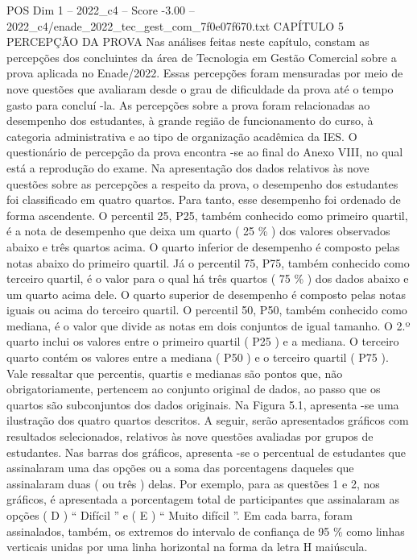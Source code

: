 \begin{textsample}{POS Dim 1 – 2022\_c4 – Score -3.00 – 2022\_c4/enade\_2022\_tec\_gest\_com\_7f0e07f670.txt}  \label{ex:f1_pos_257}
CAPÍTULO 5 PERCEPÇÃO DA PROVA Nas análises feitas neste capítulo, constam as percepções dos concluintes da área de Tecnologia em Gestão Comercial sobre a prova aplicada no Enade/2022.
Essas percepções foram mensuradas por meio de nove questões que avaliaram desde o grau de dificuldade da prova até o tempo gasto para concluí -la.
As percepções sobre a prova foram relacionadas ao desempenho dos estudantes, à grande região de funcionamento do curso, à categoria administrativa e ao tipo de organização acadêmica da IES.
O questionário de percepção da prova encontra -se ao final do Anexo VIII, no qual está a reprodução do exame.
Na apresentação dos dados relativos às nove questões sobre as percepções a respeito da prova, o desempenho dos estudantes foi classificado em quatro quartos.
Para tanto, esse desempenho foi ordenado de forma ascendente.
O percentil 25, P25, também conhecido como primeiro quartil, é a nota de desempenho que deixa um quarto ( 25 \% ) dos valores observados abaixo e três quartos acima.
O quarto inferior de desempenho é composto pelas notas abaixo do primeiro quartil.
Já o percentil 75, P75, também conhecido como terceiro quartil, é o valor para o qual há três quartos ( 75 \% ) dos dados abaixo e um quarto acima dele.
O quarto superior de desempenho é composto pelas notas iguais ou acima do terceiro quartil.
O percentil 50, P50, também conhecido como mediana, é o valor que divide as notas em dois conjuntos de igual tamanho.
O 2.º quarto inclui os valores entre o primeiro quartil ( P25 ) e a mediana.
O terceiro quarto contém os valores entre a mediana ( P50 ) e o terceiro quartil ( P75 ).
Vale ressaltar que percentis, quartis e medianas são pontos que, não obrigatoriamente, pertencem ao conjunto original de dados, ao passo que os quartos são subconjuntos dos dados originais.
Na Figura 5.1, apresenta -se uma ilustração dos quatro quartos descritos.
A seguir, serão apresentados gráficos com resultados selecionados, relativos às nove questões avaliadas por grupos de estudantes.
Nas barras dos gráficos, apresenta -se o percentual de estudantes que assinalaram uma das opções ou a soma das porcentagens daqueles que assinalaram duas ( ou três ) delas.
Por exemplo, para as questões 1 e 2, nos gráficos, é apresentada a porcentagem total de participantes que assinalaram as opções ( D ) “ Difícil ” e ( E ) “ Muito difícil ”.
Em cada barra, foram assinalados, também, os extremos do intervalo de confiança de 95 \% como linhas verticais unidas por uma linha horizontal na forma da letra H maiúscula.

\end{textsample}
